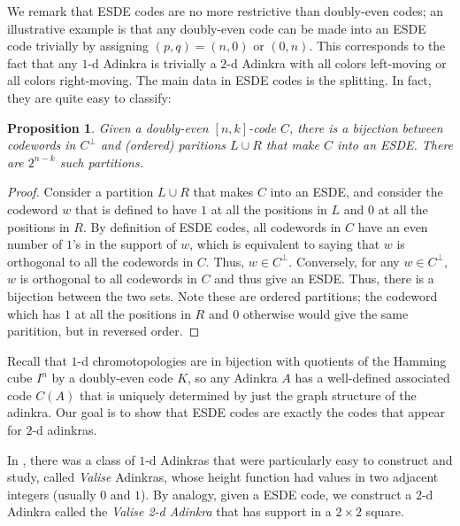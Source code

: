 \documentclass[12pt,twoside,singlespace]{article}
\numberwithin{equation}{section}
\newtheorem{prop}[equation]{Proposition}
\theoremstyle{definition}
\begin{document}
We remark that ESDE codes are no more restrictive than doubly-even codes; an illustrative example is that any doubly-even code can be made into an ESDE code trivially by assigning $(p,q) = (n, 0)$ or $(0, n)$. This corresponds to the fact that any $1$-d Adinkra is trivially a $2$-d Adinkra with all colors left-moving or all colors right-moving. The main data in ESDE codes is the splitting. In fact, they are quite easy to classify:

\begin{prop}
\label{prop:esde}
Given a doubly-even $[n,k]$-code $C$, there is a bijection between codewords in $C^\perp$ and (ordered) paritions $L \cup R$ that make $C$ into an ESDE. There are $2^{n-k}$ such partitions. 
\end{prop}

\begin{proof}
Consider a partition $L \cup R$ that makes $C$ into an ESDE, and consider the codeword $w$ that is defined to have $1$ at all the positions in $L$ and $0$ at all the positions in $R$. By definition of ESDE codes, all codewords in $C$ have an even number of $1$'s in the support of $w$, which is equivalent to saying that $w$ is orthogonal to all the codewords in $C$. Thus, $w \in C^\perp$. Conversely, for any $w \in C^\perp$, $w$ is orthogonal to all codewords in $C$ and thus give an ESDE. Thus, there is a bijection between the two sets. Note these are ordered partitions; the codeword which has $1$ at all the positions in $R$ and $0$ otherwise would give the same paritition, but in reversed order.
\end{proof}


Recall\cite{d2l:omni,d2l:topology,d2l:decodes} that $1$-d chromotopologies are in bijection with quotients of the Hamming cube $I^n$ by a doubly-even code $K$, so any Adinkra $A$ has a well-defined associated code $C(A)$ that is uniquely determined by just the graph structure of the adinkra. Our goal is to show that ESDE codes are exactly the codes that appear for $2$-d adinkras.

In \cite{d2l:first,d2l:graph-theoretic}, there was a class of $1$-d Adinkras that were particularly easy to construct and study, called {\em Valise} Adinkras, whose height function had values in two adjacent integers (usually $0$ and $1$).  By analogy, given a ESDE code, we construct a $2$-d Adinkra called the {\em Valise 2-d Adinkra} that has support in a $2\times 2$ square.
\end{document}
